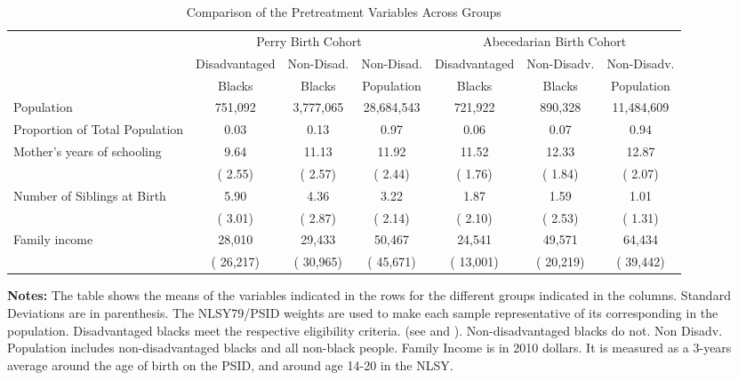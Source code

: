 \begin{table}[htbp]
\caption{\label{tab:pretreat} Comparison of the Pretreatment Variables Across Groups}\medskip
\footnotesize  \begin{center} \begin{tabular}{lcccccc}  \hline \hline    
 \multicolumn{1}{c}{      }  & \multicolumn{3}{c}{Perry Birth Cohort}  & \multicolumn{3}{c}{Abecedarian Birth Cohort} \\  \multicolumn{1}{c}{      }  & \multicolumn{1}{c}{Disadvantaged}  & \multicolumn{1}{c}{Non-Disad.}  & \multicolumn{1}{c}{Non-Disad.}  & \multicolumn{1}{c}{Disadvantaged}  & \multicolumn{1}{c}{Non-Disadv.}  & \multicolumn{1}{c}{Non-Disadv.} \\  \multicolumn{1}{c}{      }  & \multicolumn{1}{c}{Blacks}  & \multicolumn{1}{c}{Blacks}  & \multicolumn{1}{c}{Population}  & \multicolumn{1}{c}{Blacks}  & \multicolumn{1}{c}{Blacks}  & \multicolumn{1}{c}{Population} \\   \hline   
Population  &      751,092 &    3,777,065 &   28,684,543 &      721,922 &      890,328 &   11,484,609 \\[0.1cm]  
Proportion of Total Population &         0.03 &         0.13 &         0.97 &         0.06 &         0.07 &         0.94 \\[0.1cm]  
Mother's years of schooling  &         9.64 &        11.13 &        11.92 &        11.52 &        12.33 &        12.87 \\[0.05cm]  
& (        2.55)& (        2.57)& (        2.44)& (        1.76)& (        1.84)& (        2.07) \\[0.05cm]  
Number of Siblings at Birth  &         5.90 &         4.36 &         3.22 &         1.87 &         1.59 &         1.01 \\[0.05cm]  
& (        3.01)& (        2.87)& (        2.14)& (        2.10)& (        2.53)& (        1.31) \\[0.05cm]  
Family income  &       28,010 &       29,433 &       50,467 &       24,541 &       49,571 &       64,434 \\[0.05cm]  
& (      26,217)& (      30,965)& (      45,671)& (      13,001)& (      20,219)& (      39,442) \\[0.05cm]  
  \hline \hline    \end{tabular}
 \end{center} 
       {\scriptsize  
       {\raggedright 
{\bfseries Notes:} The table shows the means of the variables indicated in the rows for the different groups  indicated in the columns. Standard Deviations are in parenthesis. The NLSY79/PSID weights are used to make each sample representative of its corresponding in the population. Disadvantaged blacks meet the  respective eligibility criteria. (see \citet{Ramey_Smith_1977_AJMD} and \citet{heckman2010analyzing} ). Non-disadvantaged blacks do  not. Non Disadv. Population includes non-disadvantaged blacks and all non-black people.  Family Income is in 2010 dollars. It is measured as a 3-years average around the age of birth on the PSID,   and around age 14-20 in the NLSY. } } 
 \end{table}
